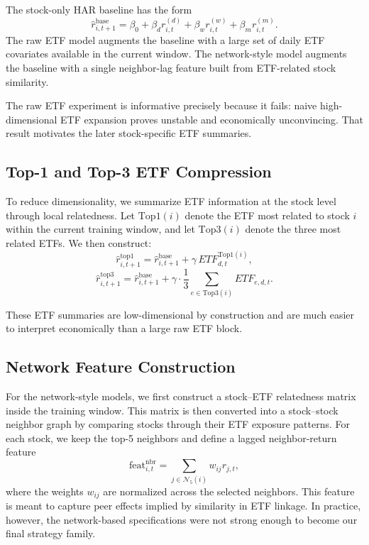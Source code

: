 The stock-only HAR baseline has the form
\[
\hat r^{\mathrm{base}}_{i,t+1}
=
\beta_0+\beta_d r^{(d)}_{i,t}+\beta_w r^{(w)}_{i,t}+\beta_m r^{(m)}_{i,t}.
\]
The raw ETF model augments the baseline with a large set of daily ETF covariates available in the current window. The network-style model augments the baseline with a single neighbor-lag feature built from ETF-related stock similarity.

The raw ETF experiment is informative precisely because it fails: naive high-dimensional ETF expansion proves unstable and economically unconvincing. That result motivates the later stock-specific ETF summaries.

\subsection{Top-1 and Top-3 ETF Compression}

To reduce dimensionality, we summarize ETF information at the stock level through local relatedness. Let $\mathrm{Top1}(i)$ denote the ETF most related to stock $i$ within the current training window, and let $\mathrm{Top3}(i)$ denote the three most related ETFs. We then construct:
\[
\hat r^{\mathrm{top1}}_{i,t+1}
=
\hat r^{\mathrm{base}}_{i,t+1}
+ \gamma \, ETF^{\mathrm{Top1}(i)}_{d,t},
\]
\[
\hat r^{\mathrm{top3}}_{i,t+1}
=
\hat r^{\mathrm{base}}_{i,t+1}
+ \gamma \cdot \frac{1}{3}\sum_{e \in \mathrm{Top3}(i)} ETF_{e,d,t}.
\]

These ETF summaries are low-dimensional by construction and are much easier to interpret economically than a large raw ETF block.

\subsection{Network Feature Construction}

For the network-style models, we first construct a stock--ETF relatedness matrix inside the training window. This matrix is then converted into a stock--stock neighbor graph by comparing stocks through their ETF exposure patterns. For each stock, we keep the top-5 neighbors and define a lagged neighbor-return feature
\[
\mathrm{feat}^{\mathrm{nbr}}_{i,t}
=
\sum_{j \in \mathcal{N}_5(i)} w_{ij} r_{j,t},
\]
where the weights $w_{ij}$ are normalized across the selected neighbors. This feature is meant to capture peer effects implied by similarity in ETF linkage. In practice, however, the network-based specifications were not strong enough to become our final strategy family.

